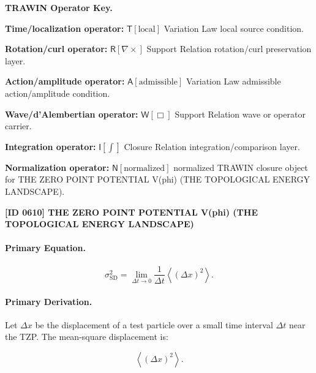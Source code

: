 \par\vspace{0.45\baselineskip}
\noindent\begin{minipage}[t]{\linewidth}
\begingroup
\small
\raggedright
\textbf{TRAWIN Operator Key.}\par
\noindent\textbf{Time/localization operator:} $\mathsf{T}\!\left[\mathrm{local}\right]$ Variation Law local source condition.\par
\noindent\textbf{Rotation/curl operator:} $\mathsf{R}\!\left[\nabla\times\right]$ Support Relation rotation/curl preservation layer.\par
\noindent\textbf{Action/amplitude operator:} $\mathsf{A}\!\left[\mathrm{admissible}\right]$ Variation Law admissible action/amplitude condition.\par
\noindent\textbf{Wave/d'Alembertian operator:} $\mathsf{W}\!\left[\Box\right]$ Support Relation wave or operator carrier.\par
\noindent\textbf{Integration operator:} $\mathsf{I}\!\left[\int\right]$ Closure Relation integration/comparison layer.\par
\noindent\textbf{Normalization operator:} $\mathsf{N}\!\left[\mathrm{normalized}\right]$ normalized TRAWIN closure object for THE ZERO POINT POTENTIAL V(phi) (THE TOPOLOGICAL ENERGY LANDSCAPE).\par
\endgroup
\end{minipage}

\clearpage
\noindent\textbf{[ID 0610] THE ZERO POINT POTENTIAL V(phi) (THE TOPOLOGICAL ENERGY LANDSCAPE)}\par
\vspace{0.35em}
\paragraph{Primary Equation.}
\begin{equation}
\sigma_{\mathrm{SD}}^{2}
=
\lim_{\Delta t\to 0}
\frac{1}{\Delta t}
\left\langle
(\Delta x)^2
\right\rangle .
\end{equation}

\paragraph{Primary Derivation.}
Let $\Delta x$ be the displacement of a test particle over a small time interval $\Delta t$ near the TZP.  
The mean-square displacement is:

\begin{equation}
\left\langle(\Delta x)^2\right\rangle .
\end{equation}

